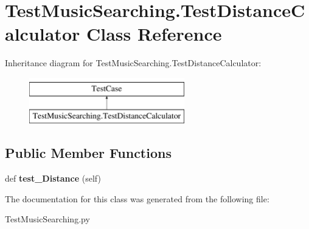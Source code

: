 \hypertarget{class_test_music_searching_1_1_test_distance_calculator}{}\section{Test\+Music\+Searching.\+Test\+Distance\+Calculator Class Reference}
\label{class_test_music_searching_1_1_test_distance_calculator}
Inheritance diagram for Test\+Music\+Searching.\+Test\+Distance\+Calculator\+:\begin{figure}[H]
\begin{center}
\leavevmode
\includegraphics[height=2.000000cm]{class_test_music_searching_1_1_test_distance_calculator}
\end{center}
\end{figure}
\subsection*{Public Member Functions}
\begin{DoxyCompactItemize}
\item 
\mbox{\label{class_test_music_searching_1_1_test_distance_calculator_ac37361ea4965452fcffed5ac4e274445}} 
def {\bfseries test\+\_\+\+Distance} (self)
\end{DoxyCompactItemize}


The documentation for this class was generated from the following file\+:\begin{DoxyCompactItemize}
\item 
Test\+Music\+Searching.\+py\end{DoxyCompactItemize}
